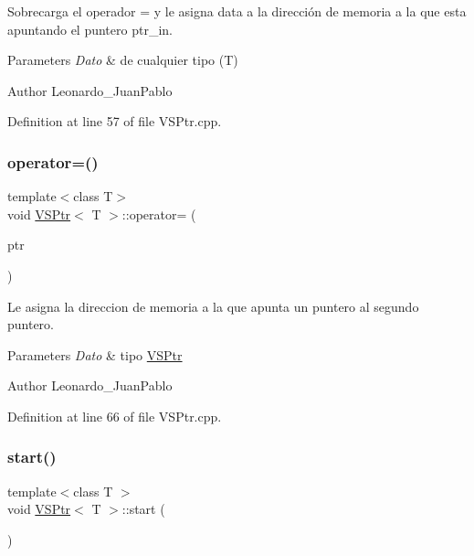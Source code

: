 Sobrecarga el operador = y le asigna data a la dirección de memoria a la que esta apuntando el puntero ptr\+\_\+in. 


\begin{DoxyParams}{Parameters}
{\em Dato} & de cualquier tipo (T) \\
\hline
\end{DoxyParams}
\begin{DoxyAuthor}{Author}
Leonardo\+\_\+\+Juan\+Pablo 
\end{DoxyAuthor}


Definition at line 57 of file V\+S\+Ptr.\+cpp.

\mbox{\label{class_v_s_ptr_aa27d1b845423f19aa9403bdd56586ab9}} 
\subsubsection{\texorpdfstring{operator=()}{operator=()}\hspace{0.1cm}{\footnotesize\ttfamily [2/2]}}
{\footnotesize\ttfamily template$<$class T$>$ \\
void \hyperlink{class_v_s_ptr}{V\+S\+Ptr}$<$ T $>$\+::operator= (\begin{DoxyParamCaption}\item[{\hyperlink{class_v_s_ptr}{V\+S\+Ptr}$<$ T $>$ $\ast$}]{ptr }\end{DoxyParamCaption})}



Le asigna la direccion de memoria a la que apunta un puntero al segundo puntero. 


\begin{DoxyParams}{Parameters}
{\em Dato} & tipo \hyperlink{class_v_s_ptr}{V\+S\+Ptr} \\
\hline
\end{DoxyParams}
\begin{DoxyAuthor}{Author}
Leonardo\+\_\+\+Juan\+Pablo 
\end{DoxyAuthor}


Definition at line 66 of file V\+S\+Ptr.\+cpp.

\mbox{\label{class_v_s_ptr_aeef7dd00463ef98da0e338dae756b4d5}} 
\subsubsection{\texorpdfstring{start()}{start()}}
{\footnotesize\ttfamily template$<$class T $>$ \\
void \hyperlink{class_v_s_ptr}{V\+S\+Ptr}$<$ T $>$\+::start (\begin{DoxyParamCaption}{ }\end{DoxyParamCaption})}



